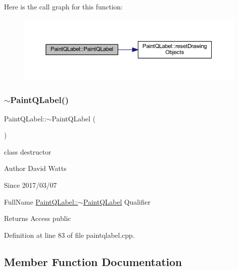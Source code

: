 Here is the call graph for this function\+:
\nopagebreak
\begin{figure}[H]
\begin{center}
\leavevmode
\includegraphics[width=350pt]{class_paint_q_label_a079e85cd5d1ec31f20f3c0bb8b510ec2_cgraph}
\end{center}
\end{figure}
\mbox{\label{class_paint_q_label_a837d8485a5da3e3fc87a30a4ada47cf2}} 
\subsubsection{\texorpdfstring{$\sim$\+Paint\+Q\+Label()}{~PaintQLabel()}}
{\footnotesize\ttfamily Paint\+Q\+Label\+::$\sim$\+Paint\+Q\+Label (\begin{DoxyParamCaption}{ }\end{DoxyParamCaption})}

class destructor

\begin{DoxyAuthor}{Author}
David Watts 
\end{DoxyAuthor}
\begin{DoxySince}{Since}
2017/03/07
\end{DoxySince}
Full\+Name \hyperlink{class_paint_q_label_a837d8485a5da3e3fc87a30a4ada47cf2}{Paint\+Q\+Label\+::$\sim$\+Paint\+Q\+Label} Qualifier \begin{DoxyReturn}{Returns}
Access public 
\end{DoxyReturn}


Definition at line 83 of file paintqlabel.\+cpp.



\subsection{Member Function Documentation}
\mbox{\label{class_paint_q_label_aa8b3fe000a0123047ef6b2c884db979a}} 
